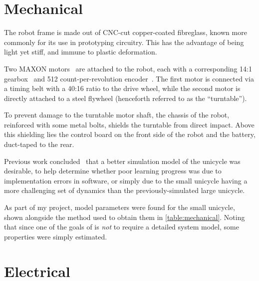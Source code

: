\documentclass[main.tex]{subfiles}
\begin{document}
\section{Mechanical}

	The robot frame is made out of CNC-cut copper-coated fibreglass, known more commonly for its use in prototyping circuitry.
	This has the advantage of being light yet stiff, and immune to plastic deformation.

	Two MAXON motors~\cite{motor} are attached to the robot, each with a corresponding 14:1 gearbox~\cite{gearbox} and 512 count-per-revolution encoder~\cite{encoder}.
	The first motor is connected via a timing belt with a 40:16 ratio to the drive wheel, while the second motor is directly attached to a steel flywheel (henceforth referred to as the \enquote{turntable}).

	To prevent damage to the turntable motor shaft, the chassis of the robot, reinforced with some metal bolts, shields the turntable from direct impact.
	Above this shielding lies the control board on the front side of the robot and the battery, duct-taped to the rear.

	Previous work concluded~\cite[p.~54]{aleksi} that a better simulation model of the unicycle was desirable, to help determine whether poor learning progress was due to implementation errors in software, or simply due to the small unicycle having a more challenging set of dynamics than the previously-simulated large unicycle.

	As part of my project, model parameters were found for the small unicycle, shown alongside the method used to obtain them in \cref{table:mechanical}.
	Noting that since one of the goals of {\Pilco} is \emph{not} to require a detailed system model, some properties were simply estimated.

	\begin{table}
		
		\label{table:mechanical}
	\end{table}


\section{Electrical}
\end{document}
